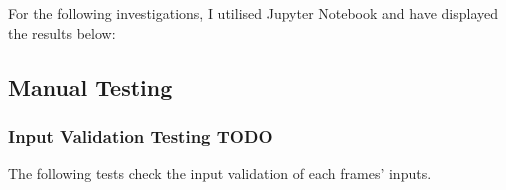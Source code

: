 \documentclass[./project-report/src/latex/project-report.tex]{subfiles}
\begin{document}
For the following investigations, I utilised Jupyter Notebook and have displayed the results below:



\label{sec:train-dataset-size-analysis}




\label{sec:cpu-vs-gpu-analysis}


\subsection{Manual Testing}

\subsubsection{Input Validation Testing TODO} %

The following tests check the input validation of each frames' inputs.
\end{document}
